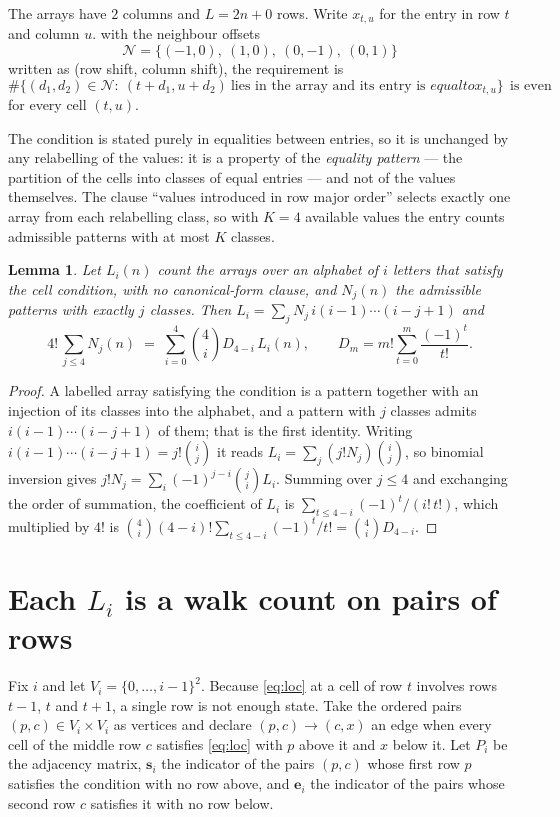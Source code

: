 \documentclass[11pt,a4paper]{article}
\theoremstyle{plain}
\newtheorem{lemma}[theorem]{Lemma}
\theoremstyle{definition}
\begin{document}
The arrays have $2$ columns and $L=2n+0$ rows. Write $x_{t,u}$ for the entry in
row $t$ and column $u$. with the neighbour offsets
\[
\mathcal N=\{(-1,0),\ (1,0),\ (0,-1),\ (0,1)\}
\]
written as (row shift, column shift), the requirement is
\begin{equation}\label{eq:loc}
\#\bigl\{(d_1,d_2)\in\mathcal N:\ (t+d_1,u+d_2)\ \text{lies in the array and its entry is }
equal to x_{t,u}\bigr\}\ \ \text{is even}
\end{equation}
for every cell $(t,u)$.

The condition is stated purely in equalities between entries, so it is unchanged by any
relabelling of the values: it is a property of the \emph{equality pattern} --- the partition
of the cells into classes of equal entries --- and not of the values themselves. The clause
``values introduced in row major order'' selects exactly one array from each relabelling
class, so with $K=4$ available values the entry counts admissible patterns with at most $K$
classes.

\begin{lemma}\label{lem:inv}
Let $L_i(n)$ count the arrays over an alphabet of $i$ letters that satisfy the cell
condition, with no canonical-form clause, and $N_j(n)$ the admissible patterns with exactly
$j$ classes. Then $L_i=\sum_j N_j\,i(i-1)\cdots(i-j+1)$ and
\[
4!\,\sum_{j\le 4}N_j(n)\;=\;\sum_{i=0}^{4}\binom{4}{i}D_{4-i}\,L_i(n),
\qquad D_m=m!\sum_{t=0}^{m}\frac{(-1)^t}{t!} .
\]
\end{lemma}

\begin{proof}
A labelled array satisfying the condition is a pattern together with an injection of its
classes into the alphabet, and a pattern with $j$ classes admits $i(i-1)\cdots(i-j+1)$ of
them; that is the first identity. Writing $i(i-1)\cdots(i-j+1)=j!\binom{i}{j}$ it reads
$L_i=\sum_j(j!N_j)\binom{i}{j}$, so binomial inversion gives
$j!N_j=\sum_i(-1)^{j-i}\binom{j}{i}L_i$. Summing over $j\le4$ and exchanging the
order of summation, the coefficient of $L_i$ is
$\sum_{t\le4-i}(-1)^t/(i!\,t!)$, which multiplied by $4!$ is
$\binom{4}{i}(4-i)!\sum_{t\le4-i}(-1)^t/t!=\binom{4}{i}D_{4-i}$.
\end{proof}

\section{Each $L_i$ is a walk count on pairs of rows}

Fix $i$ and let $V_i=\{0,\dots,i-1\}^{2}$. Because \eqref{eq:loc} at a cell of row
$t$ involves rows $t-1$, $t$ and $t+1$, a single row is not enough state. Take the
ordered pairs $(p,c)\in V_i\times V_i$ as vertices and declare $(p,c)\to(c,x)$ an edge when
every cell of the middle row $c$ satisfies \eqref{eq:loc} with $p$ above it and $x$
below it. Let $P_i$ be the adjacency matrix, $\mathbf{s}_i$ the indicator of the pairs
$(p,c)$ whose first row $p$ satisfies the condition with no row above, and
$\mathbf{e}_i$ the indicator of the pairs whose second row $c$ satisfies it with no
row below.
\end{document}
